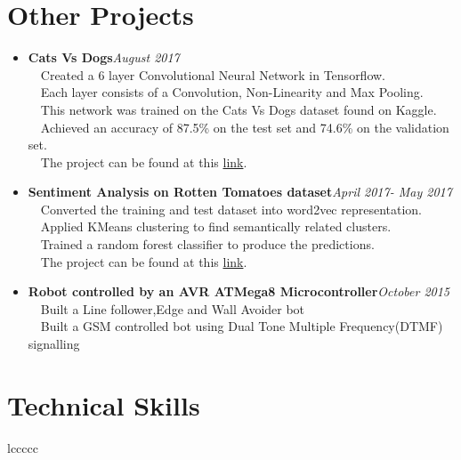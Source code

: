 \documentclass[margin, centered]{res}
\begin{document}
\begin{resume}
\section{\textbf{Other Projects}}
\begin{itemize}
\item \textbf{Cats Vs Dogs}\hfill\textit{August 2017}\\
~\textbullet~Created a 6 layer Convolutional Neural Network in Tensorflow.\\
~\textbullet~Each layer consists of a Convolution, Non-Linearity and Max Pooling.\\
~\textbullet~This network was trained on the Cats Vs Dogs dataset found on Kaggle.\\
~\textbullet~Achieved an accuracy of 87.5\% on the test set and 74.6\% on the validation set.\\
~\textbullet~The project can be found at this \href{https://github.com/harshanavkis/Dogs-Vs-Cats}{link}.\\
\end{itemize}

\begin{itemize}
\item \textbf{Sentiment Analysis on Rotten Tomatoes dataset}\hfill\textit{April 2017- May 2017}\\
~\textbullet~Converted the training and test dataset into word2vec representation.\\
~\textbullet~Applied KMeans clustering to find semantically related clusters.\\
~\textbullet~Trained a random forest classifier to produce the predictions.\\
~\textbullet~The project can be found at this \href{https://github.com/harshanavkis/Kaggle-Rotten-Tomatoes-Competition}{link}.\\
\end{itemize}

\begin{itemize}
\item \textbf{Robot controlled by an AVR ATMega8 Microcontroller}\hfill\textit{October 2015}\\
~\textbullet~Built a Line follower,Edge and Wall Avoider bot\\
~\textbullet~Built a GSM controlled bot using Dual Tone Multiple Frequency(DTMF) signalling
\end{itemize}

\section{\textbf{Technical Skills}}
\begin{tabular}{{l}ccccc}


\end{tabular}
\end{resume}
\end{document}
